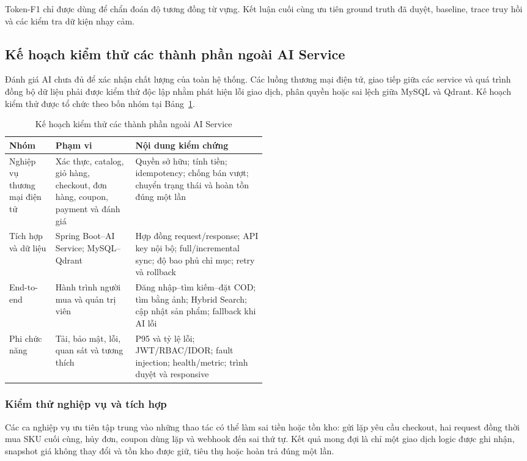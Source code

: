 Token-F1 chỉ được dùng để chẩn đoán độ tương đồng từ vựng. Kết luận cuối cùng ưu tiên ground truth đã duyệt, baseline, trace truy hồi và các kiểm tra dữ kiện nhạy cảm.

\subsection{Kế hoạch kiểm thử các thành phần ngoài AI Service}

Đánh giá AI chưa đủ để xác nhận chất lượng của toàn hệ thống. Các luồng thương mại điện tử, giao tiếp giữa các service và quá trình đồng bộ dữ liệu phải được kiểm thử độc lập nhằm phát hiện lỗi giao dịch, phân quyền hoặc sai lệch giữa MySQL và Qdrant. Kế hoạch kiểm thử được tổ chức theo bốn nhóm tại Bảng~\ref{tab:system-test-plan}.

\begin{table}[H]
\centering
\caption{Kế hoạch kiểm thử các thành phần ngoài AI Service}
\label{tab:system-test-plan}
\begin{tabularx}{\linewidth}{|p{0.18\linewidth}|p{0.31\linewidth}|X|}
\hline
\textbf{Nhóm} & \textbf{Phạm vi} & \textbf{Nội dung kiểm chứng} \\ \hline
Nghiệp vụ thương mại điện tử & Xác thực, catalog, giỏ hàng, checkout, đơn hàng, coupon, payment và đánh giá & Quyền sở hữu; tính tiền; idempotency; chống bán vượt; chuyển trạng thái và hoàn tồn đúng một lần \\ \hline
Tích hợp và dữ liệu & Spring Boot--AI Service; MySQL--Qdrant & Hợp đồng request/response; API key nội bộ; full/incremental sync; độ bao phủ chỉ mục; retry và rollback \\ \hline
End-to-end & Hành trình người mua và quản trị viên & Đăng nhập--tìm kiếm--đặt COD; tìm bằng ảnh; Hybrid Search; cập nhật sản phẩm; fallback khi AI lỗi \\ \hline
Phi chức năng & Tải, bảo mật, lỗi, quan sát và tương thích & P95 và tỷ lệ lỗi; JWT/RBAC/IDOR; fault injection; health/metric; trình duyệt và responsive \\ \hline
\end{tabularx}
\end{table}

\subsubsection{Kiểm thử nghiệp vụ và tích hợp}

Các ca nghiệp vụ ưu tiên tập trung vào những thao tác có thể làm sai tiền hoặc tồn kho: gửi lặp yêu cầu checkout, hai request đồng thời mua SKU cuối cùng, hủy đơn, coupon dùng lặp và webhook đến sai thứ tự. Kết quả mong đợi là chỉ một giao dịch logic được ghi nhận, snapshot giá không thay đổi và tồn kho được giữ, tiêu thụ hoặc hoàn trả đúng một lần.

